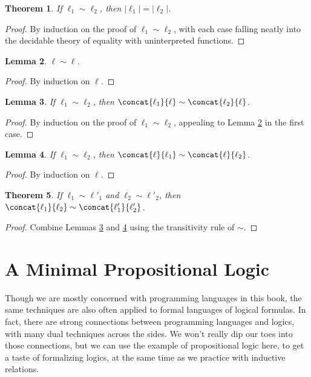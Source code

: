 \documentclass{amsbook}
\newtheorem{theorem}{Theorem}[chapter]
\newtheorem{lemma}[theorem]{Lemma}
\theoremstyle{definition}
\theoremstyle{remark}
\numberwithin{section}{chapter}
\numberwithin{equation}{chapter}
\begin{document}
\begin{theorem}
  If $\ell_1 \sim \ell_2$, then $|\ell_1| = |\ell_2|$.
\end{theorem}
\begin{proof}
  By induction on the proof of $\ell_1 \sim \ell_2$, with each case falling neatly into the decidable theory of equality with uninterpreted functions.
\end{proof}

\begin{lemma}\label{Permutation_refl}
  $\ell \sim \ell$.
\end{lemma}
\begin{proof}
  By induction on $\ell$.
\end{proof}
  
\begin{lemma}\label{Permutation_app1}
  If $\ell_1 \sim \ell_2$, then $\concat{\ell_1}{\ell} \sim \concat{\ell_2}{\ell}$.
\end{lemma}
\begin{proof}
  By induction on the proof of $\ell_1 \sim \ell_2$, appealing to Lemma \ref{Permutation_refl} in the first case.
\end{proof}

\begin{lemma}\label{Permutation_app2}
  If $\ell_1 \sim \ell_2$, then $\concat{\ell}{\ell_1} \sim \concat{\ell}{\ell_2}$.
\end{lemma}
\begin{proof}
  By induction on $\ell$.
\end{proof}

\begin{theorem}
  If $\ell_1 \sim \ell'_1$ and $\ell_2 \sim \ell'_2$, then $\concat{\ell_1}{\ell_2} \sim \concat{\ell'_1}{\ell'_2}$.
\end{theorem}
\begin{proof}
  Combine Lemmas \ref{Permutation_app1} and \ref{Permutation_app2} using the transitivity rule of $\sim$.
\end{proof}

\section{A Minimal Propositional Logic}

Though we are mostly concerned with programming languages in this book, the same techniques are also often applied to formal languages of logical formulas.
In fact, there are strong connections between programming languages and logics, with many dual techniques across the sides.
We won't really dip our toes into those connections, but we can use the example of propositional logic here, to get a taste of formalizing logics, at the same time as we practice with inductive relations.
\end{document}
